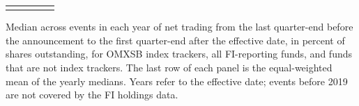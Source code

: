 \begin{threeparttable}
\begin{tabular}{@{}lcccc}
\addlinespace[0.25ex]
\bottomrule
\end{tabular}
\endgroup
\noindent\begin{minipage}{\linewidth}\smallskip\footnotesize
Median across events in each year of net trading from the last quarter-end before the announcement to the first quarter-end after the effective date, in percent of shares outstanding, for OMXSB index trackers, all FI-reporting funds, and funds that are not index trackers. The last row of each panel is the equal-weighted mean of the yearly medians. Years refer to the effective date; events before 2019 are not covered by the FI holdings data.\end{minipage}

\end{threeparttable}